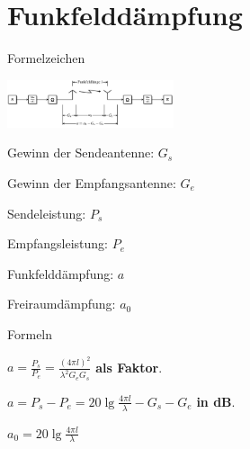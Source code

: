\documentclass[german]{latex4ei/latex4ei_sheet}
\begin{document}
    \section{Funkfelddämpfung}
    \begin{sectionbox}
        \begin{symbolbox}{Formelzeichen}
            \item \includegraphics[width=185px]{img/Funkuebertragungssystem.png}
            \item Gewinn der Sendeantenne: $G_s$
            \item Gewinn der Empfangsantenne: $G_e$
            \item Sendeleistung: $P_s$
            \item Empfangsleistung: $P_e$
            \item Funkfelddämpfung: $a$
            \item Freiraumdämpfung: $a_0$
        \end{symbolbox}
        
        \begin{bluebox}{Formeln}
            \item $a = \frac{P_s}{P_e} = \frac{(4\pi l)^2}{\lambda^2 G_e G_s}$ \textbf{als Faktor}.
            \item $a = P_s - P_e = 20\lg \frac{4\pi l}{\lambda}-G_s-G_e$ \textbf{in dB}.
            \item $a_0 = 20\lg \frac{4\pi l}{\lambda}$
        \end{bluebox}
    \end{sectionbox}
\end{document}
